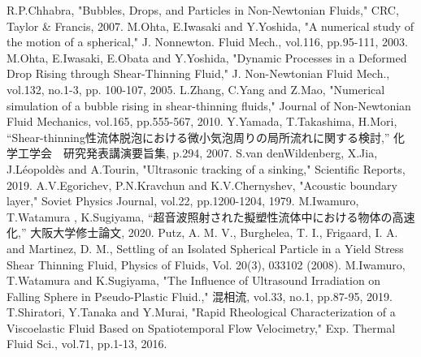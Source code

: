 \begin{thebibliography}{99}
     R.P.Chhabra, "Bubbles, Drops, and Particles in Non-Newtonian Fluids," CRC, Taylor \& Francis, 2007.
     M.Ohta, E.Iwasaki and Y.Yoshida, "A numerical study of the motion of a spherical," J. Nonnewton. Fluid Mech., vol.116, pp.95-111, 2003.
     M.Ohta, E.Iwasaki, E.Obata and Y.Yoshida, "Dynamic Processes in a Deformed Drop Rising through Shear-Thinning Fluid," J. Non-Newtonian Fluid Mech., vol.132, no.1-3, pp. 100-107, 2005.
     L.Zhang, C.Yang and Z.Mao, "Numerical simulation of a bubble rising in shear-thinning fluids," Journal of Non-Newtonian Fluid Mechanics, vol.165, pp.555-567, 2010.
     Y.Yamada, T.Takashima, H.Mori, “Shear-thinning性流体脱泡における微小気泡周りの局所流れに関する検討,” 化学工学会　研究発表講演要旨集, p.294, 2007.
     S.van denWildenberg, X.Jia, J.Léopoldès and A.Tourin, "Ultrasonic tracking of a sinking," Scientific Reports, 2019.
     A.V.Egorichev, P.N.Kravchun and K.V.Chernyshev, "Acoustic boundary layer," Soviet Physics Journal, vol.22, pp.1200-1204, 1979.
     M.Iwamuro, T.Watamura , K.Sugiyama, “超音波照射された擬塑性流体中における物体の高速化,” 大阪大学修士論文, 2020.
     Putz, A. M. V., Burghelea, T. I., Frigaard, I. A. and Martinez, D. M., Settling of an Isolated Spherical Particle in a Yield Stress Shear Thinning Fluid, Physics of Fluids, Vol. 20(3), 033102 (2008).
     M.Iwamuro, T.Watamura and K.Sugiyama, "The Influence of Ultrasound Irradiation on Falling Sphere in Pseudo-Plastic Fluid.," 混相流, vol.33, no.1, pp.87-95, 2019.
     T.Shiratori, Y.Tanaka and Y.Murai, "Rapid Rheological Characterization of a Viscoelastic Fluid Based on Spatiotemporal Flow Velocimetry," Exp. Thermal Fluid Sci., vol.71, pp.1-13, 2016.
\end{thebibliography}